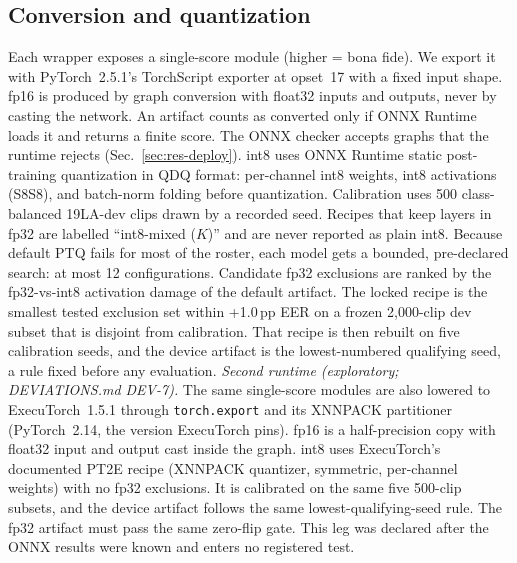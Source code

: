 \documentclass[journal]{IEEEtran}
\begin{document}
\subsection{Conversion and quantization}
Each wrapper exposes a single-score module (higher = bona fide). We export it
with PyTorch~2.5.1's TorchScript exporter at opset~17 with a fixed input shape.
fp16 is produced by graph conversion with float32 inputs and outputs, never by
casting the network. An artifact counts as converted only if ONNX Runtime loads
it and returns a finite score. The ONNX checker accepts graphs that the runtime
rejects (Sec.~\ref{sec:res-deploy}).
int8 uses ONNX Runtime static post-training quantization \cite{jacob18_int8} in QDQ format:
per-channel int8 weights, int8 activations (S8S8), and batch-norm folding
before quantization. Calibration uses 500 class-balanced 19LA-dev clips drawn
by a recorded seed. Recipes that keep layers in fp32 are labelled
``int8-mixed (\(K\))'' and are never reported as plain int8. Because default
PTQ fails for most of the roster, each model gets a bounded, pre-declared
search: at most 12 configurations. Candidate fp32 exclusions are ranked by the
fp32-vs-int8 activation damage of the default artifact. The locked recipe is
the smallest tested exclusion set within +1.0\,pp EER on a frozen 2,000-clip dev
subset that is disjoint from calibration. That recipe is then rebuilt on five
calibration seeds, and the device artifact is the lowest-numbered qualifying
seed, a rule fixed before any evaluation.
\emph{Second runtime (exploratory; DEVIATIONS.md DEV-7).} The same single-score
modules are also lowered to ExecuTorch~1.5.1 through \texttt{torch.export} and
its XNNPACK partitioner (PyTorch~2.14, the version ExecuTorch pins). fp16 is
a half-precision copy with float32 input and output cast inside the graph.
int8 uses ExecuTorch's documented PT2E recipe (XNNPACK quantizer, symmetric,
per-channel weights) with no fp32 exclusions. It is calibrated on the same five
500-clip subsets, and the device artifact follows the same lowest-qualifying-seed
rule. The fp32 artifact must pass the same zero-flip gate. This leg was declared
after the ONNX results were known and enters no registered test.
\end{document}
